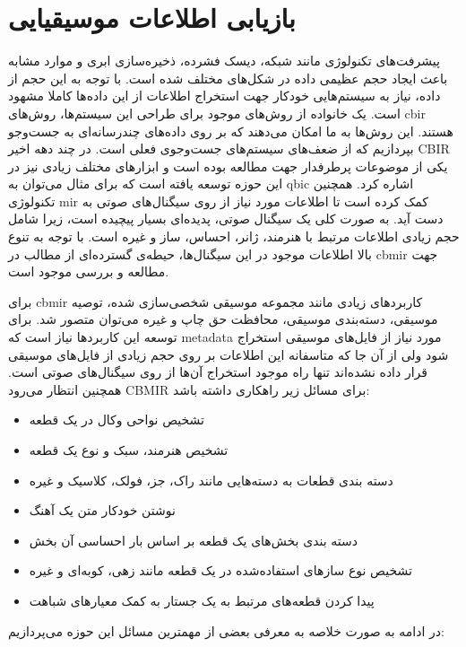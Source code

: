 \section{بازیابی اطلاعات موسیقیایی}
پیشرفت‌های تکنولوژی مانند شبکه، دیسک فشرده، ذخیره‌سازی ابری و موارد مشابه باعث
ایجاد حجم عظیمی داده در شکل‌های مختلف شده است. با توجه به این حجم از داده، نیاز
به سیستم‌هایی خودکار جهت استخراج اطلاعات از این داده‌ها کاملا مشهود است. یک
خانواده از روش‌های موجود برای طراحی این سیستم‌ها، روش‌های \gls{cbir} هستند. این
روش‌ها به ما امکان می‌دهند که بر روی داده‌های چندرسانه‌ای به جست‌وجو بپردازیم که
از ضعف‌های سیستم‌های جست‌وجوی فعلی است. در چند دهه اخیر \gls{CBIR} یکی از
موضوعات پرطرفدار جهت مطالعه بوده است و ابزارهای مختلف زیادی نیز در این حوزه
توسعه یافته است که برای مثال می‌توان به \gls{qbic} اشاره کرد. همچنین تکنولوژی
\gls{mir} کمک کرده است تا اطلاعات مورد نیاز از روی سیگنال‌های صوتی به دست آید.
به صورت کلی یک سیگنال صوتی، پدیده‌ای بسیار پیچیده است، زیرا شامل حجم زیادی
اطلاعات مرتبط با هنرمند، ژانر، احساس، ساز و غیره است. با توجه به تنوع بالا
اطلاعات موجود در این سیگنال‌ها، حیطه‌ی گسترده‌ای از مطالب در \gls{cbmir} جهت
مطالعه و بررسی موجود است.

برای \gls{cbmir} کاربردهای زیادی مانند مجموعه موسیقی شخصی‌سازی شده، توصیه
موسیقی، دسته‌بندی موسیقی، محافظت حق چاپ و غیره می‌توان متصور شد. برای توسعه این
کاربردها نیاز است که \gls{metadata} مورد نیاز از فایل‌های موسیقی استخراج شود ولی
از آن جا که متاسفانه این اطلاعات بر روی حجم زیادی از فایل‌های موسیقی قرار داده
نشده‌اند تنها راه موجود استخراج آن‌ها از روی سیگنال‌های صوتی است. همچنین انتظار
می‌رود \gls{CBMIR} برای مسائل زیر راهکاری داشته باشد:
\begin{itemize}
    \item تشخیص نواحی وکال در یک قطعه
    \item تشخیص هنرمند، سبک و نوع یک قطعه
    \item دسته بندی قطعات به دسته‌هایی مانند راک، جز، فولک، کلاسیک و غیره
    \item نوشتن خودکار متن یک آهنگ
    \item دسته بندی بخش‌های یک قطعه بر اساس بار احساسی آن بخش
    \item تشخیص نوع سازهای استفاده‌شده در یک قطعه مانند زهی، کوبه‌ای و غیره
    \item پیدا کردن قطعه‌های مرتبط به یک جستار به کمک معیارهای شباهت	
\end{itemize}

در ادامه به صورت خلاصه به معرفی بعضی از مهمترین مسائل این حوزه می‌پردازیم:

